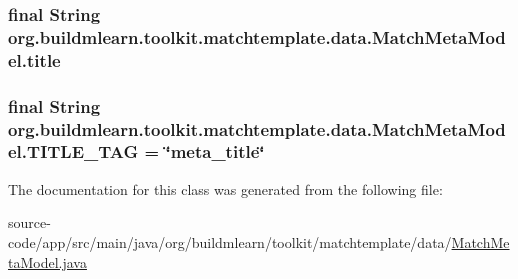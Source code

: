 \subsubsection[{\texorpdfstring{title}{title}}]{\setlength{\rightskip}{0pt plus 5cm}final String org.\+buildmlearn.\+toolkit.\+matchtemplate.\+data.\+Match\+Meta\+Model.\+title\hspace{0.3cm}{\ttfamily [private]}}\hypertarget{classorg_1_1buildmlearn_1_1toolkit_1_1matchtemplate_1_1data_1_1MatchMetaModel_a4c103cc147f50bef03dd5e9587bb8de1}{}\label{classorg_1_1buildmlearn_1_1toolkit_1_1matchtemplate_1_1data_1_1MatchMetaModel_a4c103cc147f50bef03dd5e9587bb8de1}
\subsubsection[{\texorpdfstring{T\+I\+T\+L\+E\+\_\+\+T\+AG}{TITLE_TAG}}]{\setlength{\rightskip}{0pt plus 5cm}final String org.\+buildmlearn.\+toolkit.\+matchtemplate.\+data.\+Match\+Meta\+Model.\+T\+I\+T\+L\+E\+\_\+\+T\+AG = \char`\"{}meta\+\_\+title\char`\"{}\hspace{0.3cm}{\ttfamily [static]}}\hypertarget{classorg_1_1buildmlearn_1_1toolkit_1_1matchtemplate_1_1data_1_1MatchMetaModel_a62d5c2b9c215bbcbac19b3a0dd1e52f5}{}\label{classorg_1_1buildmlearn_1_1toolkit_1_1matchtemplate_1_1data_1_1MatchMetaModel_a62d5c2b9c215bbcbac19b3a0dd1e52f5}


The documentation for this class was generated from the following file\+:\begin{DoxyCompactItemize}
\item 
source-\/code/app/src/main/java/org/buildmlearn/toolkit/matchtemplate/data/\hyperlink{matchtemplate_2data_2MatchMetaModel_8java}{Match\+Meta\+Model.\+java}\end{DoxyCompactItemize}
